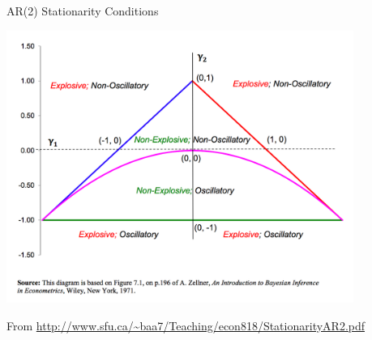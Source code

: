 \documentclass[11pt,ignorenonframetext,]{beamer}
\begin{document}
\begin{frame}{AR(2) Stationarity Conditions}

\begin{center}
\includegraphics[width=0.85\textwidth]{figs/ar2_conditions.png}
\end{center}

\tiny{From \url{http://www.sfu.ca/~baa7/Teaching/econ818/StationarityAR2.pdf}}

\end{frame}
\end{document}
